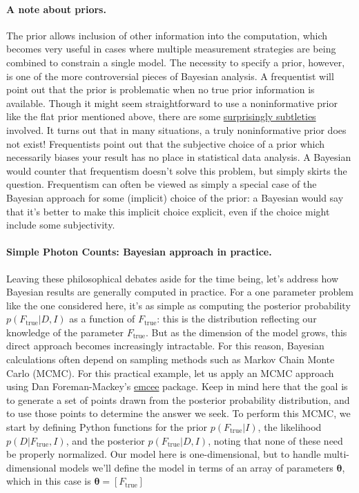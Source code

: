 \documentclass[%
oneside,                 %
final,                   %
10pt]{article}
\begin{document}
\paragraph{A note about priors.}
The prior allows inclusion of other information into the computation, which becomes very useful in cases where multiple measurement strategies are being combined to constrain a single model. The necessity to specify a prior, however, is one of the more controversial pieces of Bayesian analysis.
A frequentist will point out that the prior is problematic when no true prior information is available. Though it might seem straightforward to use a noninformative prior like the flat prior mentioned above, there are some \href{{http://normaldeviate.wordpress.com/2013/07/13/lost-causes-in-statistics-ii-noninformative- priors/comment-page-1/}}{surprisingly subtleties} involved. It turns out that in many situations, a truly noninformative prior does not exist! Frequentists point out that the subjective choice of a prior which necessarily biases your result has no place in statistical data analysis.
A Bayesian would counter that frequentism doesn't solve this problem, but simply skirts the question. Frequentism can often be viewed as simply a special case of the Bayesian approach for some (implicit) choice of the prior: a Bayesian would say that it's better to make this implicit choice explicit, even if the choice might include some subjectivity.

\paragraph{Simple Photon Counts: Bayesian approach in practice.}
Leaving these philosophical debates aside for the time being, let's address how Bayesian results are generally computed in practice. For a one parameter problem like the one considered here, it's as simple as computing the posterior probability $p(F_\mathrm{true} | D,I)$ as a function of $F_\mathrm{true}$: this is the distribution reflecting our knowledge of the parameter $F_\mathrm{true}$.
But as the dimension of the model grows, this direct approach becomes increasingly intractable. For this reason, Bayesian calculations often depend on sampling methods such as Markov Chain Monte Carlo (MCMC). For this practical example, let us apply an MCMC approach using Dan Foreman-Mackey's \href{{http://dan.iel.fm/emcee/current/}}{emcee} package. Keep in mind here that the goal is to generate a set of points drawn from the posterior probability distribution, and to use those points to determine the answer we seek.
To perform this MCMC, we start by defining Python functions for the prior $p(F_\mathrm{true} | I)$, the likelihood $p(D | F_\mathrm{true},I)$, and the posterior $p(F_\mathrm{true} | D,I)$, noting that none of these need be properly normalized. Our model here is one-dimensional, but to handle multi-dimensional models we'll define the model in terms of an array of parameters $\boldsymbol{\theta}$, which in this case is $\boldsymbol{\theta} = [F_\mathrm{true}]$
\end{document}
